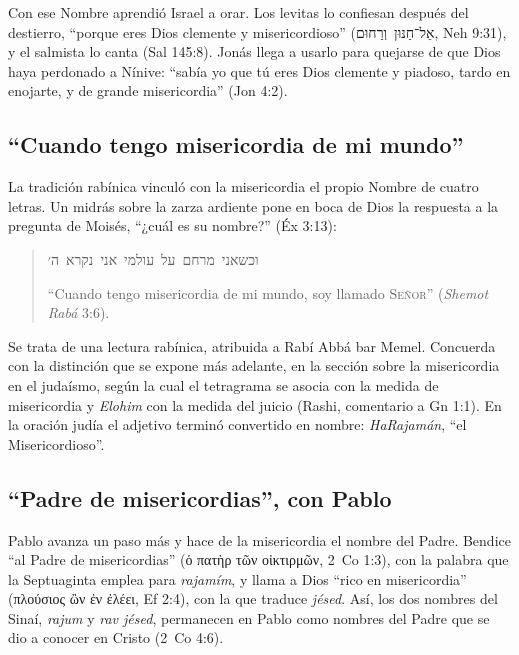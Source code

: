 \documentclass[11pt,letterpaper]{article}
\newcommand{\heb}[1]{\mbox{\foreignlanguage{hebrew}{#1}}}
\newcommand{\grc}[1]{\foreignlanguage{ancientgreek}{#1}}
\newcommand{\SENOR}{\textsc{Señor}}
\begin{document}
Con ese Nombre aprendió Israel a orar. Los levitas lo confiesan después del destierro, ``porque eres Dios clemente y misericordioso'' (\heb{אֵל־חַנּוּן וְרַחוּם}, Neh 9:31), y el salmista lo canta (Sal 145:8). Jonás llega a usarlo para quejarse de que Dios haya perdonado a Nínive: ``sabía yo que tú eres Dios clemente y piadoso, tardo en enojarte, y de grande misericordia'' (Jon 4:2).

\subsection{``Cuando tengo misericordia de mi mundo''}
La tradición rabínica vinculó con la misericordia el propio Nombre de cuatro letras. Un midrás sobre la zarza ardiente pone en boca de Dios la respuesta a la pregunta de Moisés, ``¿cuál es su nombre?'' (Éx 3:13):

\begin{quote}\small
\heb{וכשאני מרחם על עולמי אני נקרא ה׳}\par\smallskip
``Cuando tengo misericordia de mi mundo, soy llamado \SENOR{}'' (\emph{Shemot Rabá} 3:6).
\end{quote}

\begin{nota}[Precisión]
Se trata de una lectura rabínica, atribuida a Rabí Abbá bar Memel. Concuerda con la distinción que se expone más adelante, en la sección sobre la misericordia en el judaísmo, según la cual el tetragrama se asocia con la medida de misericordia y \emph{Elohim} con la medida del juicio (Rashi, comentario a Gn 1:1). En la oración judía el adjetivo terminó convertido en nombre: \emph{HaRajamán}, ``el Misericordioso''.
\end{nota}

\subsection{``Padre de misericordias'', con Pablo}
Pablo avanza un paso más y hace de la misericordia el nombre del Padre. Bendice ``al Padre de misericordias'' (\grc{ὁ πατὴρ τῶν οἰκτιρμῶν}, 2~Co 1:3), con la palabra que la Septuaginta emplea para \emph{rajamím}, y llama a Dios ``rico en misericordia'' (\grc{πλούσιος ὢν ἐν ἐλέει}, Ef 2:4), con la que traduce \emph{jésed}. Así, los dos nombres del Sinaí, \emph{rajum} y \emph{rav jésed}, permanecen en Pablo como nombres del Padre que se dio a conocer en Cristo (2~Co 4:6).
\end{document}

